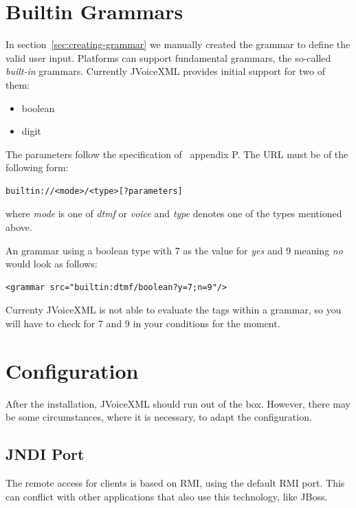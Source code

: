 \documentclass[11pt,a4paper]{article}
\begin{document}
\section{Builtin Grammars}

In section~\ref{sec:creating-grammar} we manually created the grammar to
define the valid user input. Platforms can support fundamental grammars, the
so-called \emph{built-in} grammars. Currently JVoiceXML provides initial support
for two of them:
\begin{itemize}
  \item boolean
  \item digit
\end{itemize}

The parameters follow the specification of~\cite{w3.org:voicexml} appendix P.
The URL must be of the following form:

\begin{lstlisting}
builtin://<mode>/<type>[?parameters]
\end{lstlisting}

where \emph{mode} is one of \emph{dtmf} or \emph{voice} and \emph{type} denotes
one of the types mentioned above.

An grammar using a boolean type with 7 as the value for \emph{yes} and 9
meaning \emph{no} would look as follows:

\begin{lstlisting}
<grammar src="builtin:dtmf/boolean?y=7;n=9"/>
\end{lstlisting}

Currenty JVoiceXML is not able to evaluate the tags within a  grammar, so you
will have to check for 7 and 9 in your conditions for the moment.

\section{Configuration}
\label{sec:configuration}

After the installation, JVoiceXML should run out of the box. However, there may 
be some circumstances, where it is necessary, to adapt the configuration.

\subsection{JNDI Port}

The remote access for clients is based on RMI, using the default RMI port. This
can conflict with other applications that also use this technology, like JBoss.
\end{document}
